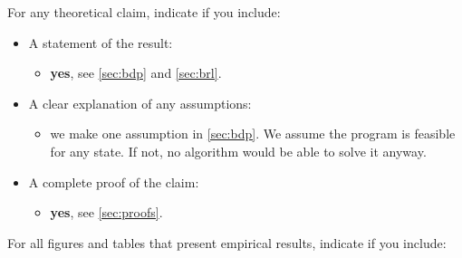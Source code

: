 For any theoretical claim, indicate if you include:

\begin{itemize}
    \item  A statement of the result:
     \begin{itemize}
        \item  \textbf{yes}, see \autoref{sec:bdp} and \autoref{sec:brl}.\end{itemize}
    \item A clear explanation of any assumptions:
    \begin{itemize}
        \item  we make one assumption in \autoref{sec:bdp}. We assume the program is feasible for any state. If not, no algorithm would be able to solve it anyway.\end{itemize}
    \item A complete proof of the claim:
    \begin{itemize}
        \item  \textbf{yes}, see \autoref{sec:proofs}. 
    \end{itemize}
\end{itemize}

For all figures and tables that present empirical results, indicate if you include:

